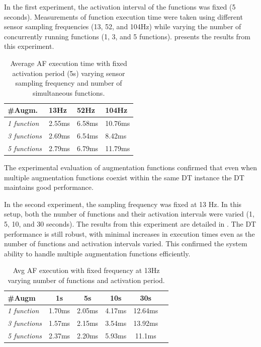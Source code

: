 In the first experiment, the activation interval of the functions was fixed (5 seconds).
Measurements of function execution time were taken using different sensor sampling frequencies (13, 52, and 104Hz) while varying the number of concurrently running functions (1, 3, and 5 functions).
%
 presents the results from this experiment.
%
\begin{table}
    \setlength{\belowcaptionskip}{-6pt}
    \centering
    \begin{tabular}{p{4cm} p{2cm} p{2cm} p{2cm}}
    \hline
    \textbf{\#Augm.} & \textbf{13Hz} & \textbf{52Hz} & \textbf{104Hz} \\ \hline
    \textit{1 function} & 2.55ms & 6.58ms & 10.76ms \\ \hline
    \textit{3 functions} & 2.69ms & 6.54ms & 8.42ms \\ \hline
    \textit{5 functions} & 2.79ms & 6.79ms & 11.79ms \\ \hline\hline
    \end{tabular}
    \caption{Average AF execution time with fixed activation period (5s) varying sensor sampling frequency and number of simultaneous functions.}
    \label{tab:AF_exec_time_fixed_act_period}
\end{table}
%
The experimental evaluation of augmentation functions confirmed that even when multiple augmentation functions coexist within the same DT instance the \ac{DT} maintains good performance.

In the second experiment, the sampling frequency was fixed at 13 Hz.
%
In this setup, both the number of functions and their activation intervals were varied (1, 5, 10, and 30 seconds). The results from this experiment are detailed in .
The \ac{DT} performance is still robust, with minimal increases in execution times even as the number of functions and activation intervals varied. This confirmed the system ability to handle multiple augmentation functions efficiently.
%
\begin{table}
    \centering
    \begin{tabular}{p{4cm} p{0.4cm} p{2cm} p{2cm} p{2cm} p{2cm}}
    \hline
    \textbf{\#Augm} & \multicolumn{1}{c}{\textbf{1s}} & \multicolumn{1}{c}{\textbf{5s}} & \multicolumn{1}{c}{\textbf{10s}} & \multicolumn{1}{c}{\textbf{30s}}\\ \hline
    \textit{1 function} & \multicolumn{1}{c}{1.70ms} & \multicolumn{1}{c}{2.05ms} & \multicolumn{1}{c}{4.17ms} & \multicolumn{1}{c}{12.64ms}\\ \hline
    \textit{3 functions} & \multicolumn{1}{c}{1.57ms} & \multicolumn{1}{c}{2.15ms} & \multicolumn{1}{c}{3.54ms} & \multicolumn{1}{c}{13.92ms}\\ \hline
    \textit{5 functions} & \multicolumn{1}{c}{2.37ms} & \multicolumn{1}{c}{2.20ms} & \multicolumn{1}{c}{5.93ms} & \multicolumn{1}{c}{11.1ms}\\ \hline\hline
    \end{tabular}
     \caption{Avg AF execution with fixed frequency at 13Hz varying number of functions and activation period.}
    \label{tab:AF_exec_time_fixed_sens_frequency}
\end{table}

